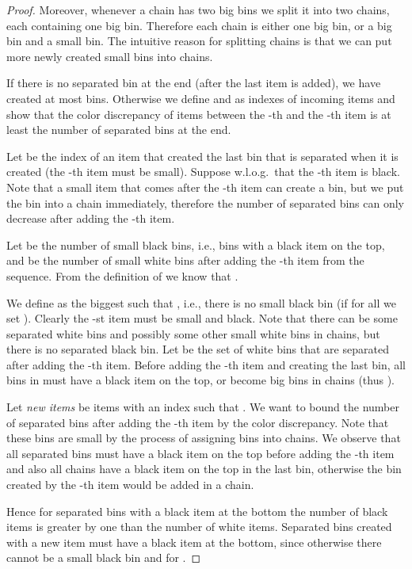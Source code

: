 \documentclass[11pt,a4paper]{article}
\begin{document}
\begin{proof}
Moreover, whenever a chain has two big bins
we split it into two chains, each containing one big bin. 
Therefore each chain is either one big bin, or a big bin and a small bin.
The intuitive reason for splitting chains is that
we can put more newly created small bins into chains.

If there is no separated bin at the end (after the last item is added),
we have created at most  bins.
Otherwise we define  and  as indexes of incoming items
and show that the color discrepancy of items between the -th and the -th item is at least the number of separated bins at the end.

Let  be the index of an item that created the last bin that is separated when it is created (the -th item must be small).
Suppose w.l.o.g.\ that the -th item is black.
Note that a small item that comes after the -th item can create a bin,
but we put the bin into a chain immediately,
therefore the number of separated bins can only decrease after adding the -th item.

Let  be the number of small black bins, i.e., bins with a black item on the top,
and  be the number of small white bins
after adding the -th item from the sequence. From the definition of  we know that .

We define  as the biggest  such that , i.e., there is no small black bin
(if  for all  we set ).
Clearly the -st item must be small and black.
Note that there can be some separated white bins and possibly some other small white bins in chains,
but there is no separated black bin.
Let  be the set of white bins that are separated after adding the -th item.
Before adding the -th item and creating the last bin, all bins in  must have a black item on the top, or become big bins in chains (thus ).

Let \textit{new items} be items with an index  such that .
We want to bound the number of separated bins after adding the -th item by the color discrepancy.
Note that these bins are small by the process of assigning bins into chains.
We observe that all separated bins must have a black item on the top before adding the -th item
and also all chains have a black item on the top in the last bin,
otherwise the bin created by the -th item would be added in a chain.

Hence for separated bins with a black item at the bottom the number of black items is greater by one than the number of white items.
Separated bins created with a new item must have a black item at the bottom,
since otherwise there cannot be a small black bin and  for .


\end{proof}
\end{document}
